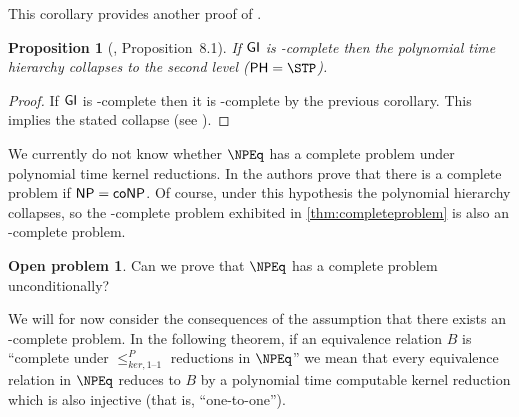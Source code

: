 \documentclass[draft]{article}
\newtheorem{proposition}[proposition]{Proposition}
\theoremstyle{definition} \newtheorem{openproblem}[openproblem]{Open problem}
\theoremstyle{definition} \newtheorem{definition}[definition]{Definition}
\theoremstyle{remark} \newtheorem{remark}[remark]{Remark}
\newcommand{\kri}{\leq^{P}_{ker,1\text{--}1}} %
\begin{document}
This corollary provides another proof of \cite[Proposition~8.1]{bcffm}.

\begin{proposition}[\cite{bcffm}, Proposition~8.1]
  If ${\mathsf{GI}}$ is \NPEq-complete then the polynomial time hierarchy collapses to the second level ($\PH=\STP$).
\end{proposition}
\begin{proof}
  If ${\mathsf{GI}}$ is \NPEq-complete then it is \NP-complete by the previous corollary.
  This implies the stated collapse (see \cite{schoning87}).
\end{proof}

We currently do not know whether $\NPEq$ has a complete problem under polynomial time kernel reductions.
In \cite{bcffm} the authors prove that there is a complete problem if ${\mathsf{NP}}={\mathsf{coNP}}$.
Of course, under this hypothesis the polynomial hierarchy collapses, so the \NPcoNPEq-complete problem exhibited in \autoref{thm:completeproblem} is also an \NPEq-complete problem.
\begin{openproblem}
  Can we prove that $\NPEq$ has a complete problem unconditionally?
\end{openproblem}

We will for now consider the consequences of the assumption that there exists an \NPEq-complete problem.
In the following theorem, if an equivalence relation $B$ is ``complete under $\kri$ reductions in $\NPEq$'' we mean that every equivalence relation in $\NPEq$ reduces to $B$ by a polynomial time computable kernel reduction which is also injective (that is, ``one-to-one'').
\end{document}
